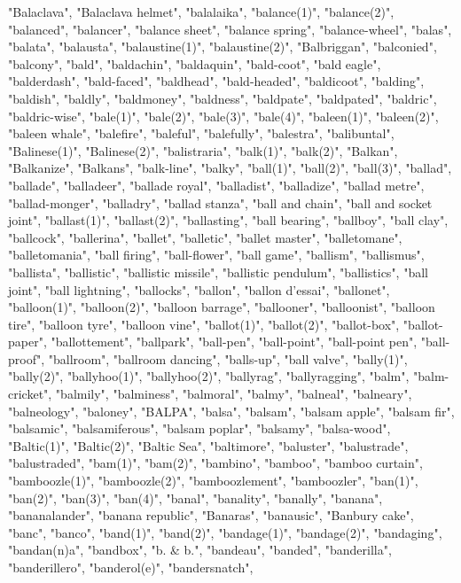 "Balaclava",
"Balaclava helmet",
"balalaika",
"balance(1)",
"balance(2)",
"balanced",
"balancer",
"balance sheet",
"balance spring",
"balance-wheel",
"balas",
"balata",
"balausta",
"balaustine(1)",
"balaustine(2)",
"Balbriggan",
"balconied",
"balcony",
"bald",
"baldachin",
"baldaquin",
"bald-coot",
"bald eagle",
"balderdash",
"bald-faced",
"baldhead",
"bald-headed",
"baldicoot",
"balding",
"baldish",
"baldly",
"baldmoney",
"baldness",
"baldpate",
"baldpated",
"baldric",
"baldric-wise",
"bale(1)",
"bale(2)",
"bale(3)",
"bale(4)",
"baleen(1)",
"baleen(2)",
"baleen whale",
"balefire",
"baleful",
"balefully",
"balestra",
"balibuntal",
"Balinese(1)",
"Balinese(2)",
"balistraria",
"balk(1)",
"balk(2)",
"Balkan",
"Balkanize",
"Balkans",
"balk-line",
"balky",
"ball(1)",
"ball(2)",
"ball(3)",
"ballad",
"ballade",
"balladeer",
"ballade royal",
"balladist",
"balladize",
"ballad metre",
"ballad-monger",
"balladry",
"ballad stanza",
"ball and chain",
"ball and socket joint",
"ballast(1)",
"ballast(2)",
"ballasting",
"ball bearing",
"ballboy",
"ball clay",
"ballcock",
"ballerina",
"ballet",
"balletic",
"ballet master",
"balletomane",
"balletomania",
"ball firing",
"ball-flower",
"ball game",
"ballism",
"ballismus",
"ballista",
"ballistic",
"ballistic missile",
"ballistic pendulum",
"ballistics",
"ball joint",
"ball lightning",
"ballocks",
"ballon",
"ballon d'essai",
"ballonet",
"balloon(1)",
"balloon(2)",
"balloon barrage",
"ballooner",
"balloonist",
"balloon tire",
"balloon tyre",
"balloon vine",
"ballot(1)",
"ballot(2)",
"ballot-box",
"ballot-paper",
"ballottement",
"ballpark",
"ball-pen",
"ball-point",
"ball-point pen",
"ball-proof",
"ballroom",
"ballroom dancing",
"balls-up",
"ball valve",
"bally(1)",
"bally(2)",
"ballyhoo(1)",
"ballyhoo(2)",
"ballyrag",
"ballyragging",
"balm",
"balm-cricket",
"balmily",
"balminess",
"balmoral",
"balmy",
"balneal",
"balneary",
"balneology",
"baloney",
"BALPA",
"balsa",
"balsam",
"balsam apple",
"balsam fir",
"balsamic",
"balsamiferous",
"balsam poplar",
"balsamy",
"balsa-wood",
"Baltic(1)",
"Baltic(2)",
"Baltic Sea",
"baltimore",
"baluster",
"balustrade",
"balustraded",
"bam(1)",
"bam(2)",
"bambino",
"bamboo",
"bamboo curtain",
"bamboozle(1)",
"bamboozle(2)",
"bamboozlement",
"bamboozler",
"ban(1)",
"ban(2)",
"ban(3)",
"ban(4)",
"banal",
"banality",
"banally",
"banana",
"bananalander",
"banana republic",
"Banaras",
"banausic",
"Banbury cake",
"banc",
"banco",
"band(1)",
"band(2)",
"bandage(1)",
"bandage(2)",
"bandaging",
"bandan(n)a",
"bandbox",
"b. \& b.",
"bandeau",
"banded",
"banderilla",
"banderillero",
"banderol(e)",
"bandersnatch",
